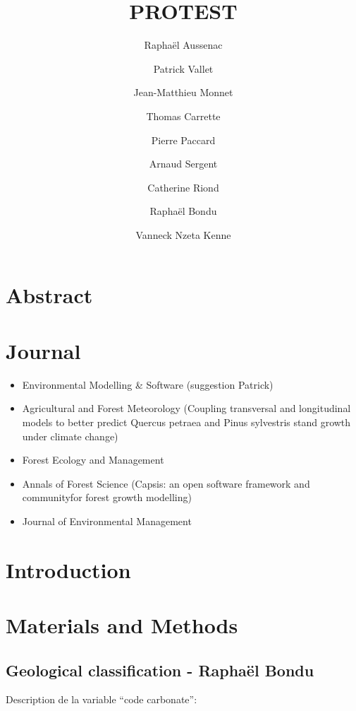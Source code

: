 \documentclass[a4paper]{article}
\title{PROTEST}
\author[1]{Raphaël Aussenac}
\author[1]{Patrick Vallet}
\author[1]{Jean-Matthieu Monnet}
\author[2]{Thomas Carrette}
\author[3]{Pierre Paccard}
\author[4]{Arnaud Sergent}
\author[5]{Catherine Riond}
\author[6]{Raphaël Bondu}
\author[1]{Vanneck Nzeta Kenne}
\affil[1]{IRSTEA grenoble}
\affil[2]{FCBA grenoble}
\affil[3]{PNR Bauges}
\affil[4]{IRSTEA Bordeaux}
\affil[5]{ONF}
\affil[6]{???}
\date{}
\begin{document}
\maketitle

\section*{Abstract}

\section*{Journal}
\begin{itemize}
    \item Environmental Modelling \& Software (suggestion Patrick)
    \item Agricultural and Forest Meteorology (Coupling transversal and longitudinal models to better predict Quercus petraea and Pinus sylvestris stand growth under climate change)
    \item Forest Ecology and Management
    \item Annals of Forest Science (Capsis: an open software framework and communityfor forest growth modelling)
    \item Journal of Environmental Management
\end{itemize}


\section*{Introduction}

\citep{cardinale2012biodiversity}

\section*{Materials and Methods}

\subsection*{Geological classification - Raphaël Bondu}

Description de la variable “code carbonate”:
\end{document}
